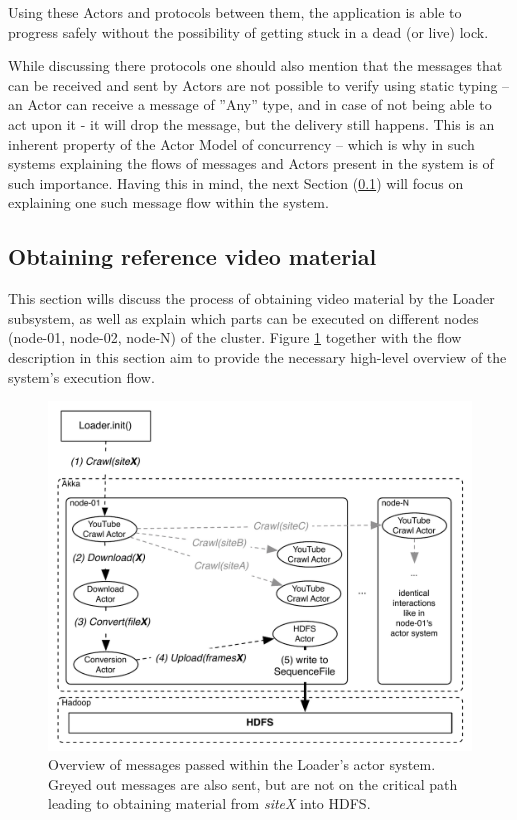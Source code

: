 Using these Actors and protocols between them, the application is able to progress safely without the possibility of getting stuck in a dead (or live) lock. 

While discussing there protocols one should also mention that the messages that can be received and sent by Actors are not possible to verify using static typing -- an Actor can receive a message of ''Any'' type, and in case of not being able to act upon it - it will drop the message, but the delivery still happens.
This is an inherent property of the Actor Model of concurrency -- which is why in such systems explaining the flows of messages and Actors present in the system is of such importance. Having this in mind, the next Section (\ref{sec:obtaining-reference-material}) will focus on explaining one such message flow within the system.

\subsection{Obtaining reference video material}
\label{sec:obtaining-reference-material}
This section wills discuss the process of obtaining video material by the Loader subsystem, as well as explain which parts can be executed on different nodes (node-01, node-02, node-N) of the cluster. Figure \ref{fig:high-level-loader} together with the flow description in this section aim to provide the necessary high-level overview of the system's execution flow.

\begin{figure}[ch!]
  \centering
  \includegraphics[scale=0.9]{img/loader-high-level.pdf}
  \caption{Overview of messages passed within the Loader's actor system. Greyed out messages are also sent, but are not on the critical path leading to obtaining material from \textit{siteX} into HDFS.}
  \label{fig:high-level-loader}
\end{figure}

